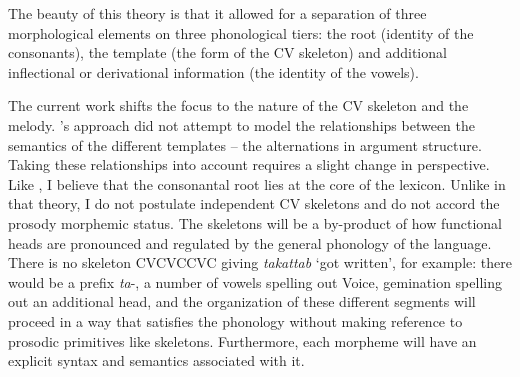 
The beauty of this theory is that it allowed for a separation of three morphological elements on three phonological tiers: the root (identity of the consonants), the template (the form of the CV skeleton) and additional inflectional or derivational information (the identity of the vowels).

The current work shifts the focus to the nature of the CV skeleton and the melody. \citeauthor{jjmcc81}'s approach did not attempt to model the relationships between the semantics of the different templates -- the alternations in argument structure. 
Taking these relationships into account requires a slight change in perspective. Like \cite{jjmcc81}, I believe that the consonantal root lies at the core of the lexicon. Unlike in that theory, I do not postulate independent CV skeletons and do not accord the prosody morphemic status. The skeletons will be a by-product of how functional heads are pronounced and regulated by the general phonology of the language. There is no skeleton CVCVCCVC giving \emph{takattab} `got written', for example: there would be a prefix \emph{ta}-, a number of vowels spelling out Voice, gemination spelling out an additional head, and the organization of these different segments will proceed in a way that satisfies the phonology without making reference to prosodic primitives like skeletons. Furthermore, each morpheme will have an explicit syntax and semantics associated with it.

